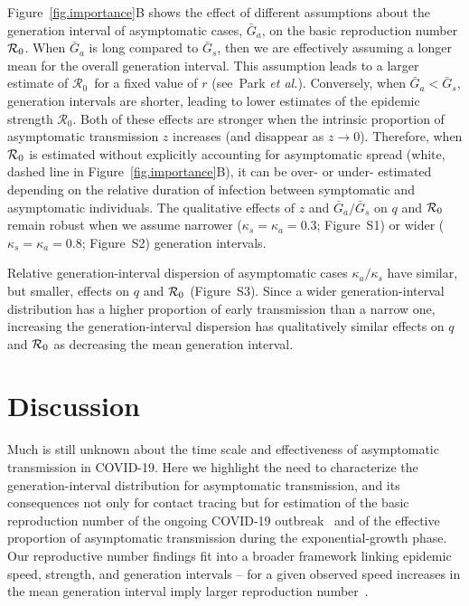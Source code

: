 \documentclass[12pt]{article}
\newcommand{\Ro}{\ensuremath{{\mathcal R}_{0}}\xspace}
\begin{document}
Figure~\ref{fig.importance}B shows the effect of different assumptions about the generation interval of asymptomatic cases, $\bar G_a$, on the basic reproduction number ${\cal{R}}_0$.
When $\bar G_a$ is long compared to $\bar G_s$, then we are effectively assuming a longer mean for the overall generation interval. 
This assumption leads to a larger estimate of \Ro\ for a fixed value of $r$ (see~Park \textit{et al.}\cite{park_2019practical}).
Conversely, when $\bar G_a < \bar G_s$, generation intervals are shorter, leading to lower estimates of the epidemic strength \Ro. Both of these effects are stronger when the intrinsic proportion of asymptomatic transmission $z$ increases (and disappear as $z\to0$).
Therefore, when ${\cal{R}}_0$ is estimated without explicitly accounting for asymptomatic spread (white, dashed line in Figure~\ref{fig.importance}B), it can be over- or under- estimated depending on the relative duration of infection between symptomatic and asymptomatic individuals.
The qualitative effects of $z$ and $\bar G_a/\bar G_s$ on $q$ and ${\cal{R}}_0$ remain robust when we assume narrower ($\kappa_s = \kappa_a = 0.3$; Figure~S1) or wider ($\kappa_s = \kappa_a = 0.8$; Figure~S2) generation intervals.

Relative generation-interval dispersion of asymptomatic cases $\kappa_a/\kappa_s$ have similar, but smaller, effects on $q$ and ${\cal{R}}_0$ (Figure~S3).
Since a wider generation-interval distribution has a higher proportion of early transmission than a narrow one, increasing the generation-interval dispersion has qualitatively similar effects on $q$ and ${\cal{R}}_0$ as decreasing the mean generation interval.

\section{Discussion}

Much is still unknown about the time scale and effectiveness of asymptomatic transmission in COVID-19.
Here we highlight the need to characterize the generation-interval distribution for asymptomatic transmission, and its consequences not only for contact tracing but for estimation of the basic reproduction number of the ongoing COVID-19 outbreak~\cite{park_preprint} and of the effective proportion of asymptomatic transmission during the exponential-growth phase.
Our reproductive number findings fit into a broader framework linking epidemic speed, strength, and generation intervals -- for a given observed speed increases in the mean generation interval imply larger reproduction number~\cite{wearing2005appropriate, roberts2007model, wallinga2007generation, powers2014impact, park_2019practical}.
\end{document}
